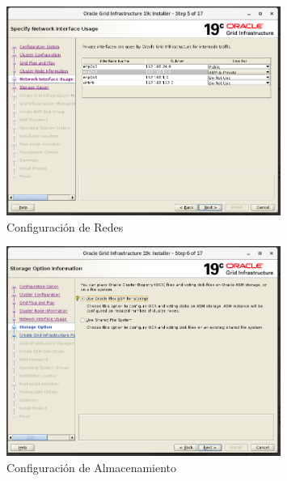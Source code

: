 \documentclass{article}
\begin{document}
\begin{figure}[H]
		\begin{center}
			\includegraphics[width=0.80\textwidth]{grid_install_05_network_interface_usage.png}
		\end{center}
		\caption{Configuración de Redes}
\end{figure}

\begin{figure}[H]
		\begin{center}
			\includegraphics[width=0.80\textwidth]{grid_install_06_storage_options.png}
		\end{center}
		\caption{Configuración de Almacenamiento}
\end{figure}
\end{document}

